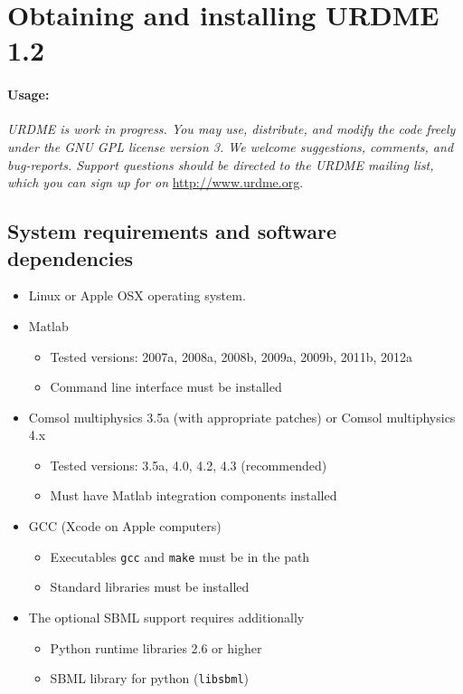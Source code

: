 \section{Obtaining and installing URDME 1.2}
\label{sec:install}

\paragraph{Usage:}

\textit{URDME is work in progress. You may use, distribute, and
 modify the code freely under the GNU GPL license version 3. We welcome
  suggestions, comments, and bug-reports. Support questions should be directed 
  to the URDME mailing list, which you can sign up for on} \url{http://www.urdme.org}.


\subsection{System requirements and software dependencies}

\begin{itemize}
\item Linux or Apple OSX operating system.
\item Matlab
  \begin{itemize}
  \item Tested versions: 2007a, 2008a, 2008b, 2009a, 2009b, 2011b, 2012a
  \item Command line interface must be installed
  \end{itemize}
\item Comsol multiphysics 3.5a (with appropriate patches) or Comsol multiphysics 4.x
  \begin{itemize}
  \item Tested versions: 3.5a, 4.0, 4.2, 4.3 (recommended)
  \item Must have Matlab integration components installed
  \end{itemize}
\item GCC (Xcode on Apple computers)
  \begin{itemize}
  \item Executables \texttt{gcc} and \texttt{make} must be in the
    path
  \item Standard libraries must be installed
  \end{itemize}
\item The optional SBML support requires additionally 
  \begin{itemize}
  \item Python runtime libraries 2.6 or higher
  \item SBML library for python (\texttt{libsbml})
  \end{itemize}
\end{itemize}

